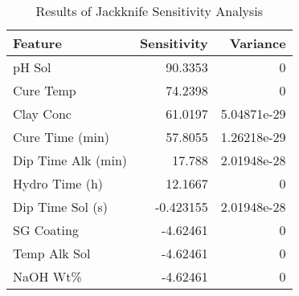 
    \begin{table*}[h]
        \centering
        \begin{tabular}{lrr}
\hline
 Feature            &   Sensitivity &    Variance \\
\hline
 pH Sol             &     90.3353   & 0           \\
 Cure Temp          &     74.2398   & 0           \\
 Clay Conc          &     61.0197   & 5.04871e-29 \\
 Cure Time (min)    &     57.8055   & 1.26218e-29 \\
 Dip Time Alk (min) &     17.788    & 2.01948e-28 \\
 Hydro Time (h)     &     12.1667   & 0           \\
 Dip Time Sol (s)   &     -0.423155 & 2.01948e-28 \\
 SG Coating         &     -4.62461  & 0           \\
 Temp Alk Sol       &     -4.62461  & 0           \\
 NaOH Wt\%          &     -4.62461  & 0           \\
\hline
\end{tabular}
        \caption{Results of Jackknife Sensitivity Analysis}
        \label{jackknife}
    \end{table*}
    
